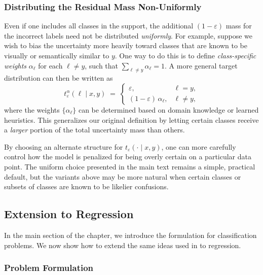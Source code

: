 \subsubsection{Distributing the Residual Mass Non-Uniformly}

Even if one includes all classes in the support, the additional \((1-\varepsilon)\) mass for the incorrect labels need not be distributed \emph{uniformly}. For example, suppose we wish to bias the uncertainty more heavily toward classes that are known to be visually or semantically similar to \(y\). One way to do this is to define \emph{class-specific weights} \(\alpha_\ell\) for each \(\ell \neq y\), such that $\sum_{\ell \neq y} \alpha_\ell = 1$. A more general target distribution can then be written as
\begin{equation}
  t^\alpha_\varepsilon(\ell \mid x,y) \;=\;
  \begin{cases}
    \varepsilon, & \ell = y,\\[4pt]
    (1-\varepsilon)\,\alpha_\ell, & \ell \neq y,
  \end{cases}
\end{equation}
where the weights \(\{\alpha_\ell\}\) can be determined based on domain knowledge or learned heuristics. This generalizes our original definition by letting certain classes receive a \emph{larger} portion of the total uncertainty mass than others.

By choosing an alternate structure for \(t_\varepsilon(\cdot\mid x,y)\), one can more carefully control how the model is penalized for being overly certain on a particular data point. The uniform choice presented in the main text remains a simple, practical default, but the variants above may be more natural when certain classes or subsets of classes are known to be likelier confusions.

\subsection{Extension to Regression}

In the main section of the chapter, we introduce the \attack formulation for classification problems. We now show how to extend the same ideas used in \attack to regression.

\label{appendix:regression}

\subsubsection{Problem Formulation}

